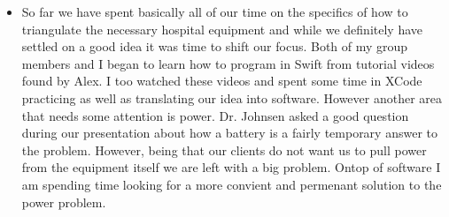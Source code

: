 \documentclass[12pt]{article}
\begin{document}
\begin{itemize}
			\item So far we have spent basically all of our time on the specifics of how to triangulate the 
			necessary hospital equipment and while we definitely have settled on a good idea it was time to shift our focus.  Both of my group members and I began to learn how to program in Swift from tutorial videos found by Alex.  I too watched these videos and spent some time in XCode practicing as well as translating our idea into software.  However another area that needs some attention is power.  Dr. Johnsen asked a good question during our presentation about how a battery is a fairly temporary answer to the problem.  However, being that our clients do not want us to pull power from the equipment itself we are left with a big problem.  Ontop of software I am spending time looking for a more convient and permenant solution to the power problem.
		\end{itemize}
		
\end{document}
